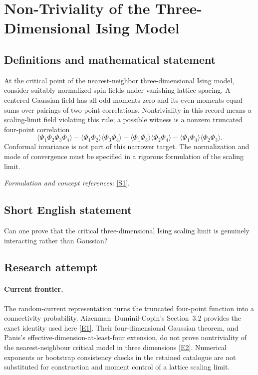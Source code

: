 \documentclass[11pt,a4paper]{article}
\numberwithin{equation}{section}
\newcommand{\sref}[2]{\hyperlink{source:#1:#2}{[S#2]}}
\newcommand{\eref}[2]{\hyperlink{extra:#1:#2}{[E#2]}}
\newif\ifshowcatalogue
\newcommand{\cataloguescope}[1]{\ifshowcatalogue
 \paragraph{Exact scope in the supplied catalogue.}
 \begin{quote}\small #1\end{quote}\fi}
\begin{document}
\setcounter{section}{0}
\section*{\texorpdfstring{Non-Triviality of the Three-Dimensional Ising Model}{Non-Triviality of the Three-Dimensional Ising Model}}\label{statement}
\subsection{Definitions and mathematical statement}
At the critical point of the nearest-neighbor three-dimensional Ising model, consider suitably normalized spin fields under vanishing lattice spacing. A centered Gaussian field has all odd moments zero and its even moments equal sums over pairings of two-point correlations. Nontriviality in this record means a scaling-limit field violating this rule; a possible witness is a nonzero truncated four-point correlation
\[
 \langle\Phi_1\Phi_2\Phi_3\Phi_4\rangle
 -\langle\Phi_1\Phi_2\rangle\langle\Phi_3\Phi_4\rangle
 -\langle\Phi_1\Phi_3\rangle\langle\Phi_2\Phi_4\rangle
 -\langle\Phi_1\Phi_4\rangle\langle\Phi_2\Phi_3\rangle.
\]
Conformal invariance is not part of this narrower target. The normalization and mode of convergence must be specified in a rigorous formulation of the scaling limit.
\par\smallskip\textit{Formulation and concept references:} \sref{statement}{1}.
\cataloguescope{Prove that the critical three-dimensional Ising model is non-trivial, that is, that its scaling limit is not Gaussian and its critical spin correlations do not factorize according to Wick's rule.}
\subsection{Short English statement}
Can one prove that the critical three-dimensional Ising scaling limit is genuinely interacting rather than Gaussian?
\subsection{Research attempt}

\paragraph{Current frontier.}
The random-current representation turns the truncated four-point function
into a connectivity probability. Aizenman--Duminil-Copin's Section~3.2
provides the exact identity used here \eref{statement}{1}. Their four-dimensional
Gaussian theorem, and Panis's effective-dimension-at-least-four extension,
do not prove nontriviality of the nearest-neighbour critical model in
three dimensions \eref{statement}{2}. Numerical exponents or bootstrap consistency
checks in the retained catalogue are not substituted for construction and
moment control of a lattice scaling limit.
\end{document}
